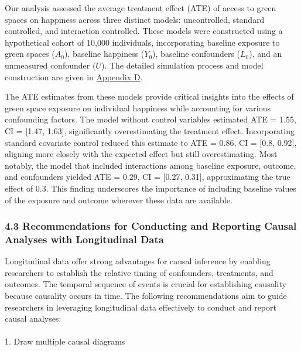 \documentclass[
  single column]{article}
\makeatletter
\let\oldparagraph\paragraph
\renewcommand{\paragraph}{
    \@ifstar
      \xxxParagraphStar
      \xxxParagraphNoStar
  }
\newcommand{\xxxParagraphStar}[1]{\oldparagraph*{#1}\mbox{}}
\newcommand{\xxxParagraphNoStar}[1]{\oldparagraph{#1}\mbox{}}
\makeatother
\begin{document}
Our analysis assessed the average treatment effect (ATE) of access to
green spaces on happiness across three distinct models: uncontrolled,
standard controlled, and interaction controlled. These models were
constructed using a hypothetical cohort of 10,000 individuals,
incorporating baseline exposure to green spaces (\(A_0\)), baseline
happiness (\(Y_0\)), baseline confounders (\(L_0\)), and an unmeasured
confounder (\(U\)). The detailed simulation process and model
construction are given in
\hyperref[appendix-simulate-longitudinal-ate]{Appendix D}.

The ATE estimates from these models provide critical insights into the
effects of green space exposure on individual happiness while accounting
for various confounding factors. The model without control variables
estimated ATE = 1.55, CI = {[}1.47, 1.63{]}, significantly
overestimating the treatment effect. Incorporating standard covariate
control reduced this estimate to ATE = 0.86, CI = {[}0.8, 0.92{]},
aligning more closely with the expected effect but still overestimating.
Most notably, the model that included interactions among baseline
exposure, outcome, and confounders yielded ATE = 0.29, CI = {[}0.27,
0.31{]}, approximating the true effect of 0.3. This finding underscores
the importance of including baseline values of the exposure and outcome
wherever these data are available.

\subsubsection{4.3 Recommendations for Conducting and Reporting Causal
Analyses with Longitudinal
Data}\label{recommendations-for-conducting-and-reporting-causal-analyses-with-longitudinal-data}

Longitudinal data offer strong advantages for causal inference by
enabling researchers to establish the relative timing of confounders,
treatments, and outcomes. The temporal sequence of events is crucial for
establishing causality because causality occurs in time. The following
recommendations aim to guide researchers in leveraging longitudinal data
effectively to conduct and report causal analyses:

\paragraph{1. Draw multiple causal
diagrams}\label{draw-multiple-causal-diagrams-1}
\end{document}
